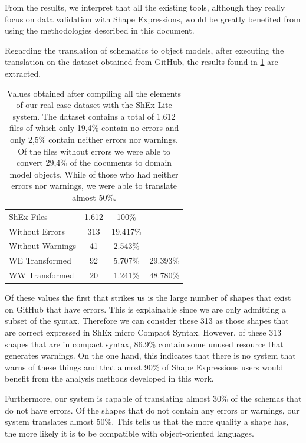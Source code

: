 From the results, we interpret that all the existing tools, although they really
focus on data validation with Shape Expressions, would be greatly benefited
from using the methodologies described in this document.

Regarding the translation of schematics to object models, after executing the
translation on the dataset obtained from GitHub, the results found in \cref{tb:real-datase-results}
are extracted.

\begin{table}
  \centering
  \caption[Values obtained after compiling all the elements of our real case dataset with the ShEx-Lite system]{Values obtained after compiling all the
  elements of our real case dataset with the ShEx-Lite system. The dataset contains a total of 1.612 files of which only 19,4\%
  contain no errors and only 2,5\% contain neither errors nor warnings. Of the files without errors we were able to convert 29,4\%
  of the documents to domain model objects. While of those who had neither errors nor warnings, we were able to translate almost 50\%.}
  \label{tb:real-datase-results}
  \begin{tabular}{l|c|cc}
    ShEx Files       & 1.612 & 100\%                        &          \\ \cline{1-3}
    Without Errors   & 313   & 19.417\%                     &          \\ \cline{1-3}
    Without Warnings & 41    & 2.543\%                      &          \\ \cline{1-3}
    WE Transformed   & 92    & \multicolumn{1}{c|}{5.707\%} & 29.393\% \\ \hline
    WW Transformed   & 20    & \multicolumn{1}{c|}{1.241\%} & 48.780\%
  \end{tabular}
\end{table}

Of these values the first that strikes us is the large number of shapes that exist on GitHub
that have errors. This is explainable since we are only admitting a subset of the syntax.
Therefore we can consider these 313 as those shapes that are correct expressed in ShEx micro
Compact Syntax. However, of these 313 shapes that are in compact syntax, 86.9\% contain some
unused resource that generates warnings. On the one hand, this indicates that there is no system
that warns of these things and that almost 90\% of Shape Expressions users would benefit from the
analysis methods developed in this work.

Furthermore, our system is capable of translating almost 30\% of the schemas that do not have errors.
Of the shapes that do not contain any errors or warnings, our system translates almost 50\%. This tells
us that the more quality a shape has, the more likely it is to be compatible with object-oriented languages.